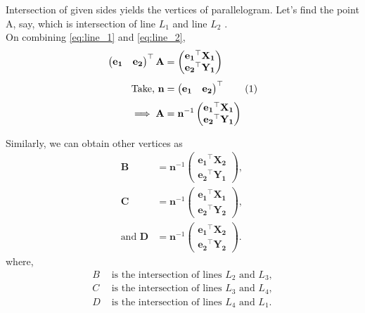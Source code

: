 \documentclass[journal,12pt,twocolumn]{IEEEtran}
\let\vec\mathbf
\newcommand{\myvec}[1]{\ensuremath{\begin{pmatrix}#1\end{pmatrix}}}
\newcommand\numberthis{\addtocounter{equation}{1}\tag{\theequation}}
\begin{document}
Intersection of given sides yields the vertices of parallelogram. Let's find the point A, say, which is intersection of line $L_1$  and line $L_2$ .\\ %



On combining \eqref{eq:line_1} and \eqref{eq:line_2}, 
\begin{align*}
		\myvec{ \vec{e_1} & \vec{e_2}}^{\top}\vec{A}&= \myvec{\vec{e_1}^{\top}\vec{X_1}\\ \vec{e_2}^{\top}\vec{Y_1} }  \\[0.7ex]
		\text{Take,	} \vec{n} &= \myvec{ \vec{e_1} & \vec{e_2}}^{\top} \numberthis \label{eq:n_matrix} \\[0.7ex]
		\implies \vec{A} &= \vec{n}^{-1} \myvec{\vec{e_1}^{\top}\vec{X_1}\\ \vec{e_2}^{\top}\vec{Y_1} }
\end{align*}


Similarly, we can obtain other vertices as
\begin{align*}
	\vec{B} &= \vec{n}^{-1} \myvec{\vec{e_1}^{\top}\vec{X_2}\\ \vec{e_2}^{\top}\vec{Y_1} } \text{, } \\[0.7ex]
	\vec{C} &= \vec{n}^{-1} \myvec{\vec{e_1}^{\top}\vec{X_1}\\ \vec{e_2}^{\top}\vec{Y_2} } \text{,}\\[0.7ex]
		\text{and  }		\vec{D} &= \vec{n}^{-1} \myvec{\vec{e_1}^{\top}\vec{X_2}\\ \vec{e_2}^{\top}\vec{Y_2} } \text{.}
\end{align*}
where,
\begin{align*}
	B & \text{ is the intersection of lines } L_2 \text{ and } L_3, \\[-0.5ex]
	C & \text{ is the intersection of lines } L_3 \text{ and }L_4,\\[-0.5ex]
	D & \text{ is the intersection of lines } L_4 \text{ and }L_1.
\end{align*}
\end{document}
